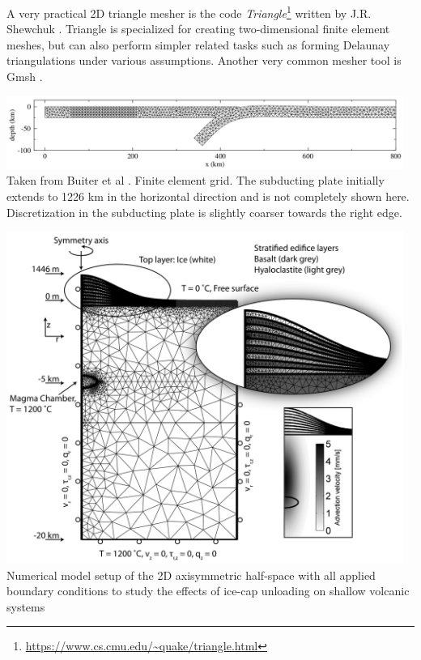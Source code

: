 A very practical 2D triangle mesher is the 
code {\sl Triangle}\footnote{\url{https://www.cs.cmu.edu/~quake/triangle.html}}
written by J.R. Shewchuk \cite{shew96,shew02,shew14}.
Triangle is specialized for creating two-dimensional finite element meshes, but can 
also perform simpler related tasks such as forming Delaunay triangulations under various assumptions.
Another very common mesher tool is Gmsh \cite{gere09}.

\begin{center}
\includegraphics[width=13cm]{images/meshes/bugw01}\\
{\captionfont Taken from Buiter et al \cite{bugw01}. Finite element grid. 
The subducting plate initially extends to 1226 km in the horizontal direction and 
is not completely shown here. Discretization in the subducting plate is slightly coarser 
towards the right edge.}
\end{center}

\begin{center}
\includegraphics[width=13cm]{images/meshes/bafl16}\\
{\captionfont Numerical model setup of the 2D axisymmetric half-space with all applied 
boundary conditions to study the effects of ice-cap unloading
on shallow volcanic systems \cite{bafl16}}
\end{center}

